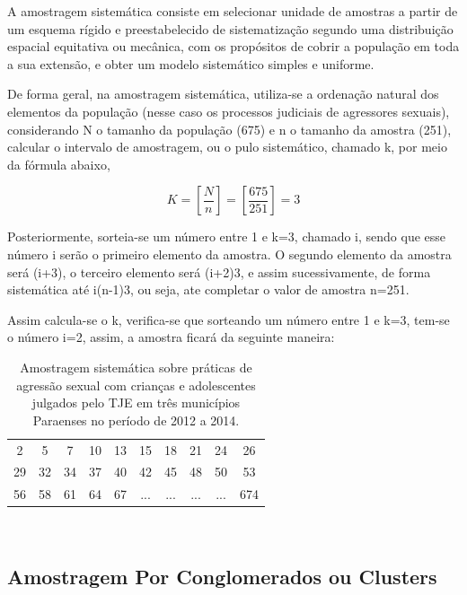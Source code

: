 
A amostragem sistemática consiste em selecionar unidade de amostras a partir
de um esquema rígido e preestabelecido de sistematização segundo uma distribuição
espacial equitativa ou mecânica, com os propósitos de cobrir a população em toda
a sua extensão, e obter um modelo sistemático simples e uniforme.\vskip0.3cm

De forma geral, na amostragem sistemática, utiliza-se a ordenação natural dos elementos da população (nesse caso os processos judiciais de agressores sexuais), considerando N o tamanho da população (675) e n o tamanho da amostra (251), calcular o intervalo de amostragem, ou o pulo sistemático, chamado k, por meio da fórmula abaixo,

\begin{equation}
K= \left[ \frac{N}{n} \right]= \left[ \frac{675}{251} \right] = 3
\end{equation}

Posteriormente, sorteia-se um número entre 1 e k=3, chamado i, sendo que esse número i serão o primeiro elemento da amostra. O segundo elemento da amostra será (i+3), o terceiro elemento será (i+2)3, e assim sucessivamente, de forma sistemática até i(n-1)3, ou seja, ate completar o valor de amostra n=251.\vskip0.3cm

Assim calcula-se o k, verifica-se que sorteando um número entre 1 e k=3, tem-se o número i=2, assim, a amostra ficará da seguinte maneira:




\begin{table}[!htb]
    \centering
    {
    \caption{Amostragem sistemática sobre práticas de agressão sexual com crianças e adolescentes julgados pelo TJE em três municípios Paraenses no período de 2012 a 2014.}
    \label{amostras estratificada}
    \vspace{0.1cm}
\begin{tabular}{c|c|c|c|c|c|c|c|c|c}
  \hline\hline
   2  & 5  & 7  & 10 & 13 & 15 & 18 & 21 & 24 & 26 \\
   29 & 32 & 34 & 37 & 40 & 42 & 45 & 48 & 50 & 53 \\
   56 & 58 & 61 & 64 & 67 & ... & ... & ... & ... & 674 \\
  \hline\hline
\end{tabular}}
\\
\hspace{-1.0cm}
\end{table}


\newpage
\subsection{Amostragem Por Conglomerados ou Clusters}

